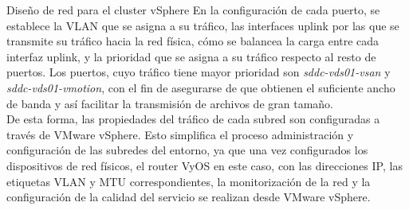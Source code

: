 \begin{subsubsection}{Diseño de red para el cluster vSphere}
  En la configuración de cada puerto, se establece la VLAN que se asigna a su tráfico, las interfaces uplink por las que se transmite su tráfico hacia la red física, cómo se balancea la carga entre cada interfaz uplink, y la prioridad que se asigna a su tráfico respecto al resto de puertos. Los puertos, cuyo tráfico tiene mayor prioridad son \textit{sddc-vds01-vsan} y \textit{sddc-vds01-vmotion}, con el fin de asegurarse de que obtienen el suficiente ancho de banda y así facilitar la transmisión de archivos de gran tamaño. 
\\
  De esta forma, las propiedades del tráfico de cada subred son configuradas a través de VMware vSphere. Esto simplifica el proceso administración y configuración de las subredes del entorno, ya que una vez configurados los dispositivos de red físicos, el router VyOS en este caso, con las direcciones IP, las etiquetas VLAN y MTU correspondientes, la monitorización de la red y la configuración de la calidad del servicio se realizan desde VMware vSphere.
\end{subsubsection}

